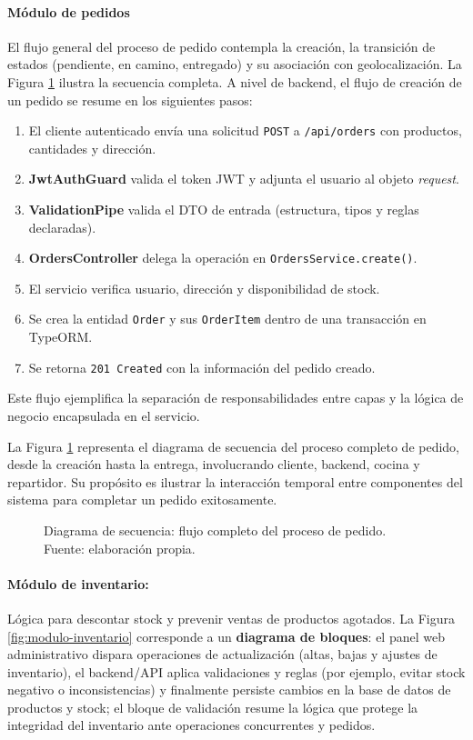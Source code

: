   \paragraph{Módulo de pedidos}
  El flujo general del proceso de pedido contempla la creación, la transición de estados (pendiente, en camino, entregado) y su asociación con geolocalización. La Figura \ref{fig:secuencia-pedido} ilustra la secuencia completa. A nivel de backend, el flujo de creación de un pedido se resume en los siguientes pasos:
  \begin{enumerate}
    \item El cliente autenticado envía una solicitud \texttt{POST} a \texttt{/api/orders} con productos, cantidades y dirección.
    \item \textbf{JwtAuthGuard} valida el token JWT y adjunta el usuario al objeto \textit{request}.
    \item \textbf{ValidationPipe} valida el DTO de entrada (estructura, tipos y reglas declaradas).
    \item \textbf{OrdersController} delega la operación en \texttt{OrdersService.create()}.
    \item El servicio verifica usuario, dirección y disponibilidad de stock.
    \item Se crea la entidad \texttt{Order} y sus \texttt{OrderItem} dentro de una transacción en TypeORM.
    \item Se retorna \texttt{201 Created} con la información del pedido creado.
  \end{enumerate}
  Este flujo ejemplifica la separación de responsabilidades entre capas y la lógica de negocio encapsulada en el servicio.

  La Figura \ref{fig:secuencia-pedido} representa el diagrama de secuencia del proceso completo de pedido, desde la creación hasta la entrega, involucrando cliente, backend, cocina y repartidor. Su propósito es ilustrar la interacción temporal entre componentes del sistema para completar un pedido exitosamente.

  \begin{figure}[htbp]
  \centering
  \resizebox{0.75\textwidth}{!}{}
  \caption[Diagrama de secuencia (pedido)]{Diagrama de secuencia: flujo completo del proceso de pedido. Fuente: elaboración propia.}
  \label{fig:secuencia-pedido}
  \end{figure}

  \paragraph{Módulo de inventario:}
  Lógica para descontar stock y prevenir ventas de productos agotados. La Figura \ref{fig:modulo-inventario} corresponde a un \textbf{diagrama de bloques}: el panel web administrativo dispara operaciones de actualización (altas, bajas y ajustes de inventario), el backend/API aplica validaciones y reglas (por ejemplo, evitar stock negativo o inconsistencias) y finalmente persiste cambios en la base de datos de productos y stock; el bloque de validación resume la lógica que protege la integridad del inventario ante operaciones concurrentes y pedidos.

